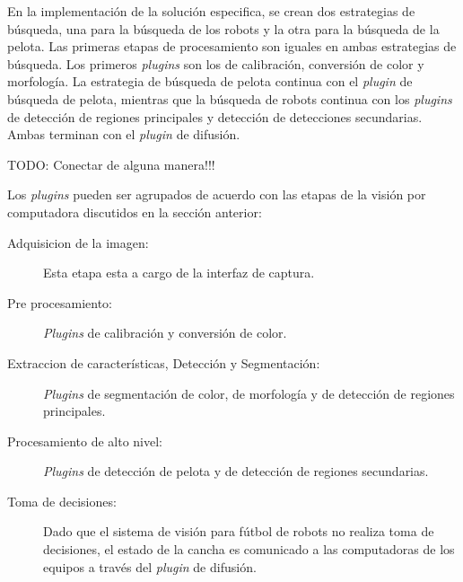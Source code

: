 En la implementación de la solución especifica, se crean dos estrategias de
búsqueda, una para la búsqueda de los robots y la otra para la búsqueda de la
pelota. Las primeras etapas de procesamiento son iguales en ambas estrategias de
búsqueda. Los primeros \emph{plugins} son los de calibración, conversión de
color y morfología. La estrategia de búsqueda de pelota continua con el
\emph{plugin} de búsqueda de pelota, mientras que la búsqueda de robots continua
con los \emph{plugins} de detección de regiones principales y detección de
detecciones secundarias. Ambas terminan con el \emph{plugin} de difusión.

TODO: Conectar de alguna manera!!!

Los \emph{plugins} pueden ser agrupados de acuerdo con las etapas de la visión
por computadora discutidos en la sección anterior:

\begin{description}

\item[Adquisicion de la imagen:] Esta etapa esta a cargo de la interfaz de
	captura.

\item[Pre procesamiento:] \emph{Plugins} de calibración y conversión de color.

\item[Extraccion de características, Detección y Segmentación:] \emph{Plugins}
	de segmentación de color, de morfología y de detección de regiones
	principales.

\item[Procesamiento de alto nivel:] \emph{Plugins} de detección de pelota y de
	detección de regiones secundarias.

\item[Toma de decisiones:] Dado que el sistema de visión para fútbol de robots
	no realiza toma de decisiones, el estado de la cancha es comunicado a
	las computadoras de los equipos a través del \emph{plugin} de difusión.

\end{description}
